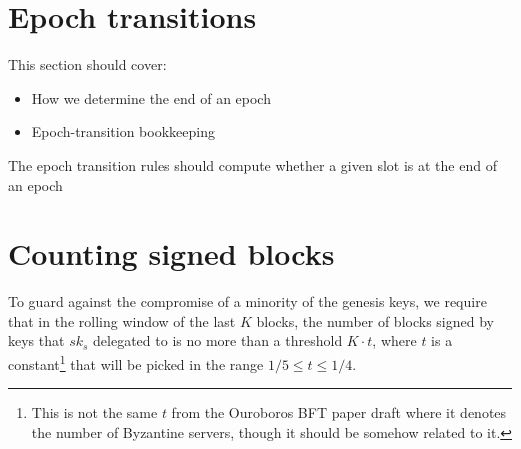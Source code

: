 \documentclass[11pt,a4paper]{article}
\newcommand{\type}[1]{\mathsf{#1}}
\begin{document}
\section{Epoch transitions}

\newcommand{\Epoch}{\type{Epoch}}

This section should cover:
\begin{itemize}
\item How we determine the end of an epoch
\item Epoch-transition bookkeeping
\end{itemize}

The epoch transition rules should compute whether a given slot is at the end of
an epoch

\section{Counting signed blocks}

\newcommand{\BSCEnv}{\type{BSCEnv}}
\newcommand{\BSCState}{\type{BSCState}}

To guard against the compromise of a minority of the genesis keys,
we require that in the rolling window of the last $K$ blocks, the number of
blocks signed by keys that $sk_s$ delegated to is no more than a threshold $K
\cdot t$, where $t$ is a constant\footnote{This is not the same $t$ from the
  Ouroboros BFT paper draft where it denotes the number of Byzantine servers,
  though it should be somehow related to it.} that will be picked in the range
$1/5 \leq t \leq 1/4$.
\end{document}
